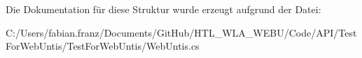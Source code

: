 Die Dokumentation für diese Struktur wurde erzeugt aufgrund der Datei\-:\begin{DoxyCompactItemize}
\item 
C\-:/\-Users/fabian.\-franz/\-Documents/\-Git\-Hub/\-H\-T\-L\-\_\-\-W\-L\-A\-\_\-\-W\-E\-B\-U/\-Code/\-A\-P\-I/\-Test\-For\-Web\-Untis/\-Test\-For\-Web\-Untis/Web\-Untis.\-cs\end{DoxyCompactItemize}
